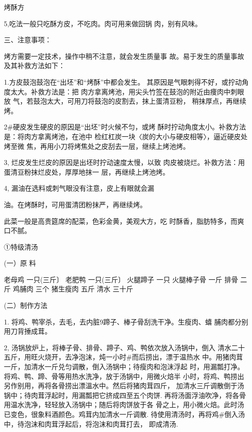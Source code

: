 \begin{recipe}{烤酥方}
\notes

5,吃法一般只吃酥方皮，不吃肉。肉可用来做回锅 肉，别有风味。

三、注意事项：

烤方需要一定技术，操作中稍不注意，就会发生质量事 故。易于发生的质量事故及其补救方法如下：

1.方皮鼓泡鼓泡在“出坯”和“烤酥”中都会发生。 其原因是气眼刺得不好，或拧动角度太大。补救方法是：把 肉方拿离烤池，用尖头竹签在鼓泡的附近由痩肉中刺眼放 气，若鼓泡太大，可用刀将鼓泡的皮割去，抹上蛋清豆粉， 稍抹厚点，再继续烤。

2#硬皮发生硬皮的原因是“出坯”时火候不匀，或烤 酥时拧动角度太小。补救方法是：将肉方拿离烤池，在池中 检红杠炭一块〈炭的大小与硬皮相等〉，逼近硬皮处烤至微 焦，再用小刀将烤焦处之皮刮去一层，继续上烤池烤。

3,	烂皮发生烂皮的原因是出坯时拧动速度太慢，以致 肉皮被烧烂。补救方法：用蛋清豆粉抹烂皮处，厚厚地抹一 层，再继续上烤池烤。

4,	漏油在选料或刺气眼没有注意，皮上有眼就会漏

油。在烤酥时，可用蛋清团粉抹严，再继续烤。

\notes

此菜一般是高贵筵席的配菜，色彩金黄，美观大方，吃 时酥香，脂肪特多，而爽口不腻。

①特级清汤

(一）原 料

老母鸡	一只(三斤〕	老肥鸭	一只(三斤〕
火腿蹄子	一只	火腿棒子骨	一斤
排骨	二斤	鸡脯肉	三个
猪生瘦肉	五斤	清水	三十斤

(二）制作方法

1.	将鸡、鸭宰杀，去毛，去内脏9蹄子、棒子骨刮洗干净。生瘦肉、蟢 脯肉都分别用刀背捶成茸。

2,	汤锅放炉上，将棒子骨、排骨、蹄子、鸡、鸭依次放入汤锅中，倒入 清水二十五斤，用旺火烧开，去净泡沫，炖一小时#而后捞出，漂于温热水 中。用猪肉茸一斤，加清水一斤兑匀调散，倒入汤锅中；待瘦肉和泡沫浮起 时，用漏瓢打净。将鸡、鸭、蹄、骨等用热水洗净，放于汤锅中，用微火焙半 小时，将鸡、鸭捞出另作别用，再将各骨捞出漂溫水中。然后将猪肉茸四斤， 加清水三斤调散倒于汤锅中；待肉茸浮起时，用漏瓢把它挤成四至五个肉饼. 再将汤面浮油吹净，将各骨用温水洗净，轻轻放入汤锅中；随后将肉饼放于各 骨之上，用小微火焙。此时汤已变色，很象料酒颜色。鸡茸内加清水一斤调散. 待使用清汤时，再将鸡#倒入汤中，待泡沫和肉茸浮起后，将泡沫和肉茸打去， 即成清汤.

\end{recipe}

